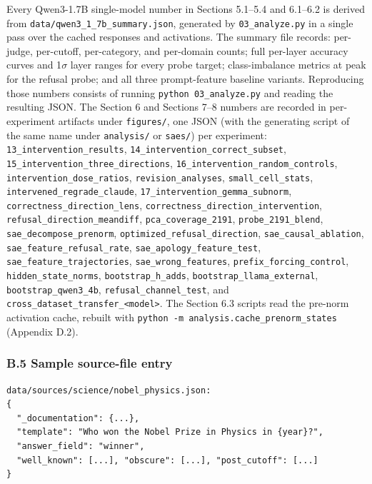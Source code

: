 Every Qwen3-1.7B single-model number in Sections 5.1--5.4 and 6.1--6.2
is derived from \texttt{data/qwen3\_1\_7b\_summary.json}, generated by
\texttt{03\_analyze.py} in a single pass over the cached responses and
activations. The summary file records: per-judge, per-cutoff,
per-category, and per-domain counts; full per-layer accuracy curves and
1\(\sigma\) layer ranges for every probe target; class-imbalance metrics
at peak for the refusal probe; and all three prompt-feature baseline
variants. Reproducing those numbers consists of running
\texttt{python\ 03\_analyze.py} and reading the resulting JSON. The
Section 6 and Sections 7--8 numbers are recorded in per-experiment
artifacts under \texttt{figures/}, one JSON (with the generating script
of the same name under \texttt{analysis/} or \texttt{saes/}) per
experiment: \texttt{13\_intervention\_results},
\texttt{14\_intervention\_correct\_subset},
\texttt{15\_intervention\_three\_directions},
\texttt{16\_intervention\_random\_controls},
\texttt{intervention\_dose\_ratios}, \texttt{revision\_analyses},
\texttt{small\_cell\_stats}, \texttt{intervened\_regrade\_claude},
\texttt{17\_intervention\_gemma\_subnorm},
\texttt{correctness\_direction\_lens},
\texttt{correctness\_direction\_intervention},
\texttt{refusal\_direction\_meandiff}, \texttt{pca\_coverage\_2191},
\texttt{probe\_2191\_blend}, \texttt{sae\_decompose\_prenorm},
\texttt{optimized\_refusal\_direction}, \texttt{sae\_causal\_ablation},
\texttt{sae\_feature\_refusal\_rate},
\texttt{sae\_apology\_feature\_test},
\texttt{sae\_feature\_trajectories}, \texttt{sae\_wrong\_features},
\texttt{prefix\_forcing\_control}, \texttt{hidden\_state\_norms},
\texttt{bootstrap\_h\_adds}, \texttt{bootstrap\_llama\_external},
\texttt{bootstrap\_qwen3\_4b}, \texttt{refusal\_channel\_test}, and
\texttt{cross\_dataset\_transfer\_\textless{}model\textgreater{}}. The
Section 6.3 scripts read the pre-norm activation cache, rebuilt with
\texttt{python\ -m\ analysis.cache\_prenorm\_states} (Appendix D.2).

\subsubsection{B.5 Sample source-file
entry}\label{b.5-sample-source-file-entry}

\begin{verbatim}
data/sources/science/nobel_physics.json:
{
  "_documentation": {...},
  "template": "Who won the Nobel Prize in Physics in {year}?",
  "answer_field": "winner",
  "well_known": [...], "obscure": [...], "post_cutoff": [...]
}
\end{verbatim}

